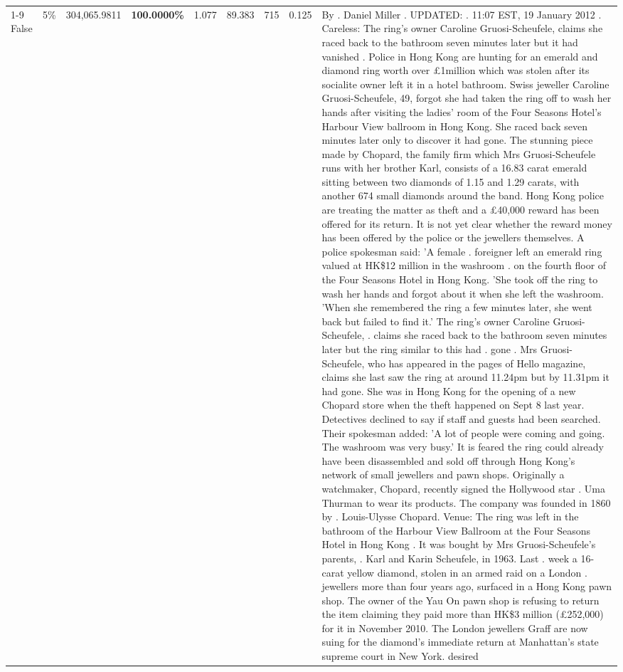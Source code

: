 \begin{table}[H]
\begin{tabular}{lllrlllll}
\cline{1-9} \cline{2-9}
False & 5\% & \color{red} 304,065.9811 & \bfseries \color{red} 100.0000\% & 1.077 & 89.383 & 715 & 0.125 & By . Daniel Miller . UPDATED: . 11:07 EST, 19 January 2012 . Careless: The ring's owner Caroline Gruosi-Scheufele, claims she raced back to the bathroom seven minutes later but it had vanished . Police in Hong Kong are hunting for an emerald and diamond ring worth over £1million which was stolen after its socialite owner left it in a hotel bathroom. Swiss jeweller Caroline Gruosi-Scheufele, 49, forgot she had taken the ring off to wash her hands after visiting the ladies' room of the Four Seasons Hotel's Harbour View ballroom in Hong Kong. She raced back seven minutes later only to discover it had gone. The stunning piece made by Chopard, the family firm which Mrs Gruosi-Scheufele runs with her brother Karl, consists of a 16.83 carat emerald sitting between two diamonds of 1.15 and 1.29 carats, with another 674 small diamonds around the band. Hong Kong police are treating the matter as theft and a £40,000 reward has been offered for its return. It is not yet clear whether the reward money has been offered by the police or the jewellers themselves. A police spokesman said: 'A female . foreigner left an emerald ring valued at HK\$12 million in the washroom . on the fourth floor of the Four Seasons Hotel in Hong Kong. 'She took off the ring to wash her hands and forgot about it when she left the washroom. 'When she remembered the ring a few minutes later, she went back but failed to find it.' The ring's owner Caroline Gruosi-Scheufele, . claims she raced back to the bathroom seven minutes later but the ring similar to this had . gone . Mrs Gruosi-Scheufele, who has appeared in the pages of Hello magazine, claims she last saw the ring at around 11.24pm but by 11.31pm it had gone. She was in Hong Kong for the opening of a new Chopard store when the theft happened on Sept 8 last year. Detectives declined to say if staff and guests had been searched. Their spokesman added: 'A lot of people were coming and going. The washroom was very busy.' It is feared the ring could already have been disassembled and sold off through Hong Kong's network of small jewellers and pawn shops. Originally a watchmaker, Chopard, recently signed the Hollywood star . Uma Thurman to wear its products. The company was founded in 1860 by . Louis-Ulysse Chopard. Venue: The ring was left in the bathroom of the Harbour View Ballroom at the Four Seasons Hotel in Hong Kong . It was bought by Mrs Gruosi-Scheufele's  parents, . Karl and Karin Scheufele, in 1963. Last . week a 16-carat yellow diamond, stolen in an armed raid on a London . jewellers more than four years ago, surfaced in a Hong Kong pawn shop. The owner of the Yau On pawn shop is refusing to return the item claiming they paid more than HK\$3 million (£252,000) for it in November 2010. The London jewellers Graff are now suing for the diamond’s immediate return at Manhattan’s state supreme court in New York. desired \\

\end{tabular}
\end{table}

